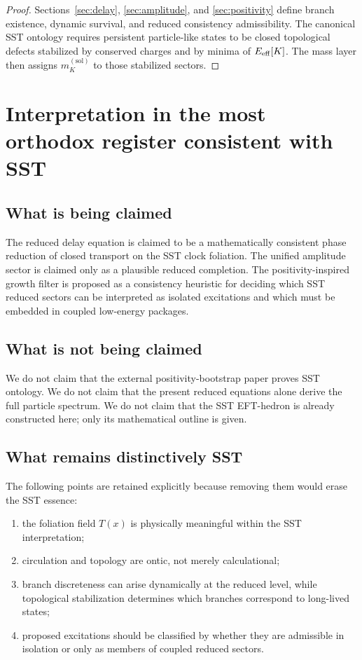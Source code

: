 \documentclass[11pt]{article}
\theoremstyle{definition}
\theoremstyle{plain}
\begin{document}
\begin{proof}
Sections~\ref{sec:delay}, \ref{sec:amplitude}, and \ref{sec:positivity} define branch existence, dynamic survival, and reduced consistency admissibility. The canonical SST ontology requires persistent particle-like states to be closed topological defects stabilized by conserved charges and by minima of \(E_{\rm eff}[K]\). The mass layer then assigns \(m_K^{(\mathrm{sol})}\) to those stabilized sectors.
\end{proof}

\section{Interpretation in the most orthodox register consistent with SST}\label{sec:interpretation}

\subsection{What is being claimed}
The reduced delay equation is claimed to be a mathematically consistent phase reduction of closed transport on the SST clock foliation. The unified amplitude sector is claimed only as a plausible reduced completion. The positivity-inspired growth filter is proposed as a consistency heuristic for deciding which SST reduced sectors can be interpreted as isolated excitations and which must be embedded in coupled low-energy packages.

\subsection{What is not being claimed}
We do not claim that the external positivity-bootstrap paper proves SST ontology. We do not claim that the present reduced equations alone derive the full particle spectrum. We do not claim that the SST EFT-hedron is already constructed here; only its mathematical outline is given.

\subsection{What remains distinctively SST}
The following points are retained explicitly because removing them would erase the SST essence:
\begin{enumerate}[label=(\alph*)]
\item the foliation field \(T(x)\) is physically meaningful within the SST interpretation;
\item circulation and topology are ontic, not merely calculational;
\item branch discreteness can arise dynamically at the reduced level, while topological stabilization determines which branches correspond to long-lived states;
\item proposed excitations should be classified by whether they are admissible in isolation or only as members of coupled reduced sectors.
\end{enumerate}
\end{document}

